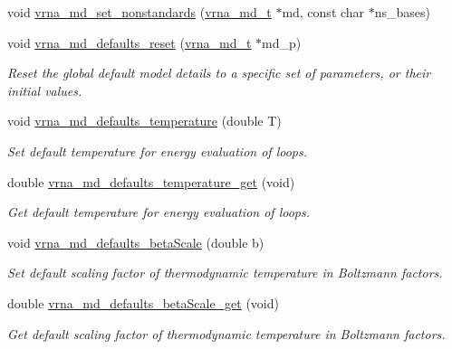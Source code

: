 \begin{DoxyCompactItemize}
void \mbox{\hyperlink{group__model__details_ga87398a419421bf5d90f246382e6ed70c}{vrna\+\_\+md\+\_\+set\+\_\+nonstandards}} (\mbox{\hyperlink{group__model__details_ga1f8a10e12a0a1915f2a4eff0b28ea17c}{vrna\+\_\+md\+\_\+t}} $\ast$md, const char $\ast$ns\+\_\+bases)
\item 
void \mbox{\hyperlink{group__model__details_ga70834424cf804d149937de89f80ceb45}{vrna\+\_\+md\+\_\+defaults\+\_\+reset}} (\mbox{\hyperlink{group__model__details_ga1f8a10e12a0a1915f2a4eff0b28ea17c}{vrna\+\_\+md\+\_\+t}} $\ast$md\+\_\+p)
\begin{DoxyCompactList}\small\item\em Reset the global default model details to a specific set of parameters, or their initial values. \end{DoxyCompactList}\item 
void \mbox{\hyperlink{group__model__details_gaf9e527e9a2f7e6fd6e42bc6e602f5445}{vrna\+\_\+md\+\_\+defaults\+\_\+temperature}} (double T)
\begin{DoxyCompactList}\small\item\em Set default temperature for energy evaluation of loops. \end{DoxyCompactList}\item 
double \mbox{\hyperlink{group__model__details_ga96b24a74437f9ba46c4e06343155bf46}{vrna\+\_\+md\+\_\+defaults\+\_\+temperature\+\_\+get}} (void)
\begin{DoxyCompactList}\small\item\em Get default temperature for energy evaluation of loops. \end{DoxyCompactList}\item 
void \mbox{\hyperlink{group__model__details_gae984567db36c3f9b8731ecc917abf3a2}{vrna\+\_\+md\+\_\+defaults\+\_\+beta\+Scale}} (double b)
\begin{DoxyCompactList}\small\item\em Set default scaling factor of thermodynamic temperature in Boltzmann factors. \end{DoxyCompactList}\item 
double \mbox{\hyperlink{group__model__details_gabb8780f5410c52f970d75b044059bd09}{vrna\+\_\+md\+\_\+defaults\+\_\+beta\+Scale\+\_\+get}} (void)
\begin{DoxyCompactList}\small\item\em Get default scaling factor of thermodynamic temperature in Boltzmann factors. \end{DoxyCompactList}\item 

\end{DoxyCompactItemize}
